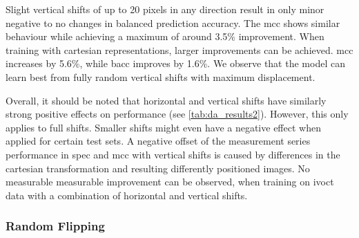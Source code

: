 Slight vertical shifts of up to 20 pixels in any direction result in only minor negative to no changes in balanced prediction accuracy. The \acrshort{mcc} shows similar behaviour while achieving a maximum of around 3.5\% improvement. When training with cartesian representations, larger improvements can be achieved. \acrshort{mcc} increases by 5.6\%, while \acrshort{bacc} improves by 1.6\%. We observe that the model can learn best from fully random vertical shifts with maximum displacement.

Overall, it should be noted that horizontal and vertical shifts have similarly strong positive effects on performance (see \cref{tab:da_results2}). However, this only applies to full shifts. Smaller shifts might even have a negative effect when applied for certain test sets. A negative offset of the measurement series performance in \acrshort{spec} and \acrshort{mcc} with vertical shifts is caused by differences in the cartesian transformation and resulting differently positioned images. No measurable measurable improvement can be observed, when training on \acrshort{ivoct} data with a combination of horizontal and vertical shifts.


\subsubsection{Random Flipping}

